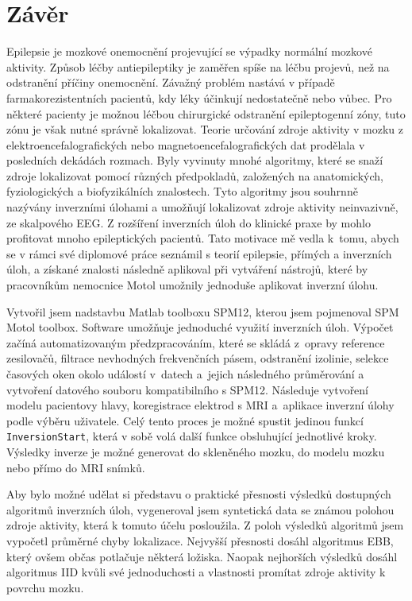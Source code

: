 
\chapter{Závěr}
Epilepsie je mozkové onemocnění projevující se výpadky normální mozkové aktivity. Způsob léčby antiepileptiky je zaměřen spíše na léčbu projevů, než na odstranění příčiny onemocnění. Závažný problém nastává v případě farmakorezistentních pacientů, kdy léky účinkují nedostatečně nebo vůbec. Pro některé pacienty je možnou léčbou chirurgické odstranění epileptogenní zóny, tuto zónu je však nutné správně lokalizovat. Teorie určování zdroje aktivity v mozku z elektroencefalografických nebo magnetoencefalografických dat prodělala v posledních dekádách rozmach. Byly vyvinuty mnohé algoritmy, které se snaží zdroje lokalizovat pomocí různých předpokladů, založených na anatomických, fyziologických a biofyzikálních znalostech. Tyto algoritmy jsou souhrnně nazývány inverzními úlohami a umožňují lokalizovat zdroje aktivity neinvazivně, ze skalpového EEG. Z rozšíření inverzních úloh do klinické praxe by mohlo profitovat mnoho epileptických pacientů. Tato motivace mě vedla k~tomu, abych se v rámci své diplomové práce seznámil s teorií epilepsie, přímých a inverzních úloh, a získané znalosti následně aplikoval při vytváření nástrojů, které by pracovníkům nemocnice Motol umožnily jednoduše aplikovat inverzní úlohu.

Vytvořil jsem nadstavbu Matlab toolboxu SPM12, kterou jsem pojmenoval SPM Motol toolbox. Software umožňuje jednoduché využití inverzních úloh. Výpočet začíná automatizovaným předzpracováním, které se skládá z~opravy reference zesilovačů, filtrace nevhodných frekvenčních pásem, odstranění izolinie, selekce časových oken okolo událostí v~datech a~jejich následného průměrování a vytvoření datového souboru kompatibilního s SPM12. Následuje vytvoření modelu pacientovy hlavy, koregistrace elektrod s MRI a~aplikace inverzní úlohy podle výběru uživatele. Celý tento proces je možné spustit jedinou funkcí \texttt{InversionStart}, která v sobě volá další funkce obsluhující jednotlivé kroky. Výsledky inverze je možné generovat do skleněného mozku, do modelu mozku nebo přímo do MRI snímků. 

Aby bylo možné udělat si představu o praktické přesnosti výsledků dostupných algoritmů inverzních úloh, vygeneroval jsem syntetická data se známou polohou zdroje aktivity, která k tomuto účelu posloužila. Z poloh výsledků algoritmů jsem vypočetl průměrné chyby lokalizace. Nejvyšší přesnosti dosáhl algoritmus EBB, který ovšem občas potlačuje některá ložiska. Naopak nejhorších výsledků dosáhl algoritmus IID kvůli své jednoduchosti a vlastnosti promítat zdroje aktivity k povrchu mozku.

